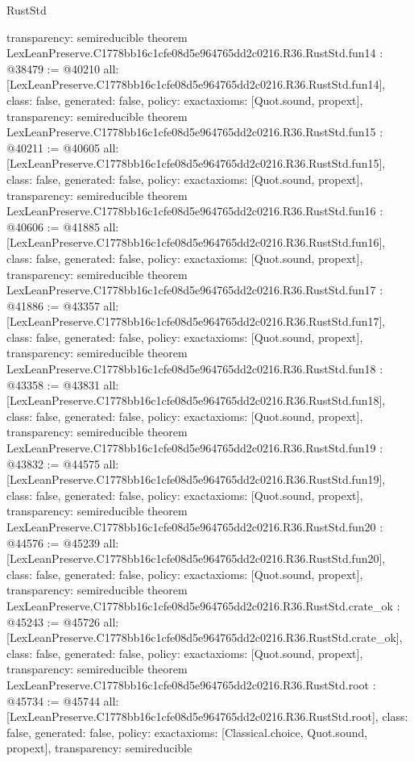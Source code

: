 \begin{lexlean}{RustStd}
\begin{coremodule}
{  transparency: semireducible
}
theorem LexLeanPreserve.C1778bb16c1cfe08d5e964765dd2c0216.R36.RustStd.fun14 : @38479 := @40210 {
  all: [LexLeanPreserve.C1778bb16c1cfe08d5e964765dd2c0216.R36.RustStd.fun14],
  class: false,
  generated: false,
  policy: exact{axioms: [Quot.sound, propext]},
  transparency: semireducible
}
theorem LexLeanPreserve.C1778bb16c1cfe08d5e964765dd2c0216.R36.RustStd.fun15 : @40211 := @40605 {
  all: [LexLeanPreserve.C1778bb16c1cfe08d5e964765dd2c0216.R36.RustStd.fun15],
  class: false,
  generated: false,
  policy: exact{axioms: [Quot.sound, propext]},
  transparency: semireducible
}
theorem LexLeanPreserve.C1778bb16c1cfe08d5e964765dd2c0216.R36.RustStd.fun16 : @40606 := @41885 {
  all: [LexLeanPreserve.C1778bb16c1cfe08d5e964765dd2c0216.R36.RustStd.fun16],
  class: false,
  generated: false,
  policy: exact{axioms: [Quot.sound, propext]},
  transparency: semireducible
}
theorem LexLeanPreserve.C1778bb16c1cfe08d5e964765dd2c0216.R36.RustStd.fun17 : @41886 := @43357 {
  all: [LexLeanPreserve.C1778bb16c1cfe08d5e964765dd2c0216.R36.RustStd.fun17],
  class: false,
  generated: false,
  policy: exact{axioms: [Quot.sound, propext]},
  transparency: semireducible
}
theorem LexLeanPreserve.C1778bb16c1cfe08d5e964765dd2c0216.R36.RustStd.fun18 : @43358 := @43831 {
  all: [LexLeanPreserve.C1778bb16c1cfe08d5e964765dd2c0216.R36.RustStd.fun18],
  class: false,
  generated: false,
  policy: exact{axioms: [Quot.sound, propext]},
  transparency: semireducible
}
theorem LexLeanPreserve.C1778bb16c1cfe08d5e964765dd2c0216.R36.RustStd.fun19 : @43832 := @44575 {
  all: [LexLeanPreserve.C1778bb16c1cfe08d5e964765dd2c0216.R36.RustStd.fun19],
  class: false,
  generated: false,
  policy: exact{axioms: [Quot.sound, propext]},
  transparency: semireducible
}
theorem LexLeanPreserve.C1778bb16c1cfe08d5e964765dd2c0216.R36.RustStd.fun20 : @44576 := @45239 {
  all: [LexLeanPreserve.C1778bb16c1cfe08d5e964765dd2c0216.R36.RustStd.fun20],
  class: false,
  generated: false,
  policy: exact{axioms: [Quot.sound, propext]},
  transparency: semireducible
}
theorem LexLeanPreserve.C1778bb16c1cfe08d5e964765dd2c0216.R36.RustStd.crate_ok : @45243 := @45726 {
  all: [LexLeanPreserve.C1778bb16c1cfe08d5e964765dd2c0216.R36.RustStd.crate_ok],
  class: false,
  generated: false,
  policy: exact{axioms: [Quot.sound, propext]},
  transparency: semireducible
}
theorem LexLeanPreserve.C1778bb16c1cfe08d5e964765dd2c0216.R36.RustStd.root : @45734 := @45744 {
  all: [LexLeanPreserve.C1778bb16c1cfe08d5e964765dd2c0216.R36.RustStd.root],
  class: false,
  generated: false,
  policy: exact{axioms: [Classical.choice, Quot.sound, propext]},
  transparency: semireducible
}


\end{coremodule}
\end{lexlean}
